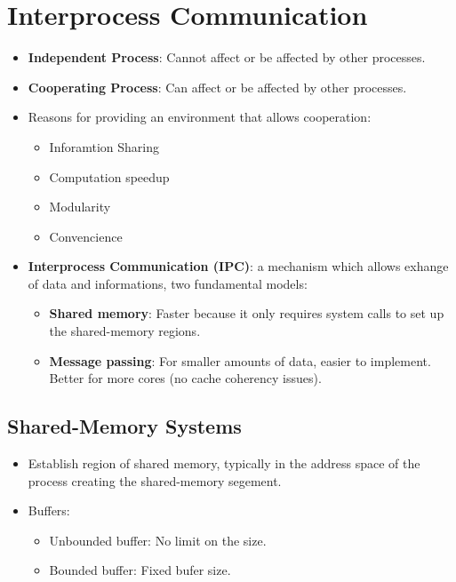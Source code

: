 \documentclass[10pt]{report}
\begin{document}
	\section{Interprocess Communication}
		\begin{itemize}
			\item \textbf{Independent Process}: Cannot affect or be affected by other processes.
			\item \textbf{Cooperating Process}: Can affect or be affected by other processes.
			\item Reasons for providing an environment that allows cooperation:
			\begin{itemize}
				\item Inforamtion Sharing
				\item Computation speedup
				\item Modularity
				\item Convencience
			\end{itemize}
			\item \textbf{Interprocess Communication (IPC)}: a mechanism which allows exhange of data and informations, two fundamental models:
			\begin{itemize}
				\item \textbf{Shared memory}: Faster because it only requires system calls to set up the shared-memory regions.
				\item \textbf{Message passing}: For smaller amounts of data, easier to implement. Better for more cores (no cache coherency issues).
			\end{itemize}
		\end{itemize}

		\subsection{Shared-Memory Systems}
			\begin{itemize}
				\item Establish region of shared memory, typically in the address space of the process creating the shared-memory segement.
				\item Buffers:
				\begin{itemize}
					\item Unbounded buffer: No limit on the size.
					\item Bounded buffer: Fixed bufer size.
				\end{itemize}
			\end{itemize}
\end{document}
